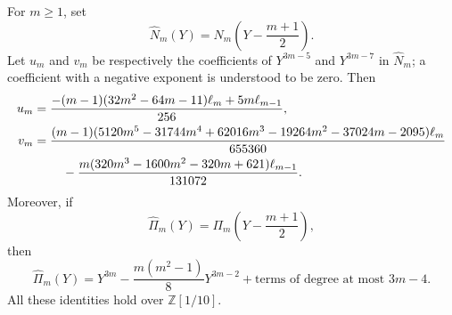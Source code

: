 \begin{lemma}
\label{lem:nv-centered-coefficients}
For $m\geq1$, set
\[
 \widehat N_m(Y)=N_m\left(Y-\frac{m+1}{2}\right).
\]
Let $u_m$ and $v_m$ be respectively the coefficients of
$Y^{3m-5}$ and $Y^{3m-7}$ in $\widehat N_m$; a coefficient with a
negative exponent is understood to be zero.  Then
\begin{align}
 u_m={}&
 \frac{-(m-1)(32m^2-64m-11)\ell_m
             +5m\ell_{m-1}}{256},                    \label{eq:nv-u}\\
 v_m={}&
 \frac{(m-1)(5120m^5-31744m^4+62016m^3-19264m^2
                    -37024m-2095)\ell_m}{655360}
 \notag\\
 &\quad-
 \frac{m(320m^3-1600m^2-320m+621)\ell_{m-1}}{131072}.
                                                        \label{eq:nv-v}
\end{align}
Moreover, if
\[
 \widehat\Pi_m(Y)=\Pi_m\left(Y-\frac{m+1}{2}\right),
\]
then
\begin{equation}
 \widehat\Pi_m(Y)
 =Y^{3m}-\frac{m(m^2-1)}8Y^{3m-2}
   +\text{terms of degree at most }3m-4.               \label{eq:nv-pi-center}
\end{equation}
All these identities hold over $\mathbb Z[1/10]$.
\end{lemma}

